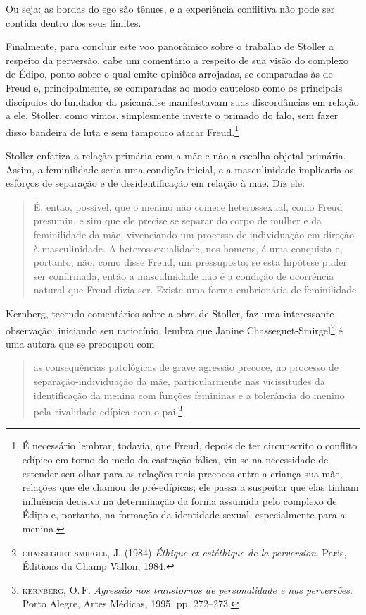 Ou seja: as bordas do ego são tênues, e a experiência conflitiva não
pode ser contida dentro dos seus limites.

Finalmente, para concluir este voo panorâmico sobre o trabalho de
Stoller a respeito da perversão, cabe um comentário a respeito de sua
visão do complexo de Édipo, ponto sobre o qual emite opiniões arrojadas,
se comparadas às de Freud e, principalmente, se comparadas ao modo
cauteloso como os principais discípulos do fundador da psicanálise
manifestavam suas discordâncias em relação a ele. Stoller, como vimos,
simplesmente inverte o primado do falo, sem fazer disso bandeira de luta
e sem tampouco atacar Freud.\footnote{É necessário lembrar, todavia, que
  Freud, depois de ter circunscrito o conflito edípico em torno do medo
  da castração fálica, viu-se na necessidade de estender seu olhar para
  as relações mais precoces entre a criança sua mãe, relações que ele
  chamou de pré-edípicas; ele passa a suspeitar que elas tinham
  influência decisiva na determinação da forma assumida pelo complexo de
  Édipo e, portanto, na formação da identidade sexual, especialmente
  para a menina.}

Stoller enfatiza a relação primária com a mãe e não a escolha objetal
primária. Assim, a feminilidade seria uma condição inicial, e a
masculinidade implicaria os esforços de separação e de desidentificação
em relação à mãe. Diz ele:

\begin{quote}
É, então, possível, que o menino não comece heterossexual, como Freud
presumiu, e sim que ele precise se separar do corpo de mulher e da
feminilidade da mãe, vivenciando um processo de individuação em direção
à masculinidade. A heterossexualidade, nos homens, é uma conquista e,
portanto, não, como disse Freud, um pressuposto; se esta hipótese puder
ser confirmada, então a masculinidade não é a condição de ocorrência
natural que Freud dizia ser. Existe uma forma embrionária de
feminilidade.
\end{quote}

Kernberg, tecendo comentários sobre a obra de Stoller, faz uma
interessante observação: iniciando seu raciocínio, lembra que Janine
Chasseguet-Smirgel\footnote{\textsc{chasseguet-smirgel}, J. (1984)
  \emph{Éthique et estéthique de la perversion}. Paris, Éditions du
  Champ Vallon, 1984.} é uma autora que se preocupou com

\begin{quote}
as consequências patológicas de grave agressão precoce, no processo de
separação-individuação da mãe, particularmente nas vicissitudes da
identificação da menina com funções femininas e a tolerância do menino
pela rivalidade edípica com o pai.\footnote{\textsc{kernberg}, O.\,F.
  \emph{Agressão nos transtornos de personalidade e nas perversões}.
  Porto Alegre, Artes Médicas, 1995, pp. 272--273.}
\end{quote}

